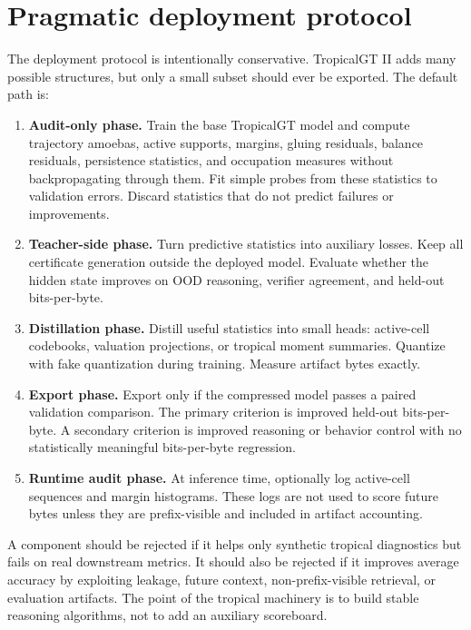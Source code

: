 \documentclass[11pt]{article}
\begin{document}
\section{Pragmatic deployment protocol}

The deployment protocol is intentionally conservative.  TropicalGT II adds many possible structures, but only a small subset should ever be exported.  The default path is:
\begin{enumerate}
\item \textbf{Audit-only phase.}  Train the base TropicalGT model and compute trajectory amoebas, active supports, margins, gluing residuals, balance residuals, persistence statistics, and occupation measures without backpropagating through them.  Fit simple probes from these statistics to validation errors.  Discard statistics that do not predict failures or improvements.
\item \textbf{Teacher-side phase.}  Turn predictive statistics into auxiliary losses.  Keep all certificate generation outside the deployed model.  Evaluate whether the hidden state improves on OOD reasoning, verifier agreement, and held-out bits-per-byte.
\item \textbf{Distillation phase.}  Distill useful statistics into small heads: active-cell codebooks, valuation projections, or tropical moment summaries.  Quantize with fake quantization during training.  Measure artifact bytes exactly.
\item \textbf{Export phase.}  Export only if the compressed model passes a paired validation comparison.  The primary criterion is improved held-out bits-per-byte.  A secondary criterion is improved reasoning or behavior control with no statistically meaningful bits-per-byte regression.
\item \textbf{Runtime audit phase.}  At inference time, optionally log active-cell sequences and margin histograms.  These logs are not used to score future bytes unless they are prefix-visible and included in artifact accounting.
\end{enumerate}

A component should be rejected if it helps only synthetic tropical diagnostics but fails on real downstream metrics.  It should also be rejected if it improves average accuracy by exploiting leakage, future context, non-prefix-visible retrieval, or evaluation artifacts.  The point of the tropical machinery is to build stable reasoning algorithms, not to add an auxiliary scoreboard.
\end{document}

